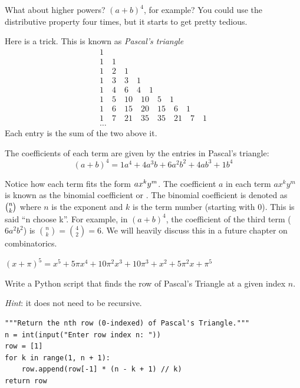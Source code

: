 What about higher powers? $(a + b)^4$, for example? You could use the
distributive property four times, but it starts to get pretty tedious.

Here is a trick. This is known as \emph{Pascal's triangle}
\begin{equation*}
\begin{array}{c}
 1 \\
 1 \quad 1 \\
 1 \quad 2 \quad 1 \\
 1 \quad 3 \quad 3 \quad 1 \\
 1 \quad 4 \quad 6 \quad 4 \quad 1 \\
 1 \quad 5 \quad 10 \quad 10 \quad 5 \quad 1 \\
 1 \quad 6 \quad 15 \quad 20 \quad 15 \quad 6 \quad 1 \\
 1 \quad 7 \quad 21 \quad 35 \quad 35 \quad 21 \quad 7 \quad 1 \\
 \ldots
\end{array}
\end{equation*}
Each entry is the sum of the two above it.

The coefficients of each term are given by the entries in Pascal's triangle:
\begin{equation*}
(a + b)^4 = 1a^4 + 4a^3b + 6a^2 b^2 + 4 a b^3 + 1 b^4   
\end{equation*}

Notice how each term fits the form ${\displaystyle \textstyle ax^{k}y^{m}}$. The coefficient ${\displaystyle a}$ 
in each term $\textstyle ax^{k}y^{m}$ is known as the binomial coefficient or . The binomial coefficient is denoted 
as ${\displaystyle \textstyle \binom{n}{k}}$ where $n$ is the exponent and $k$ is the term number (starting with 0). 
This is said ``n choose k''.  For example, in $(a + b)^4$, the coefficient of the third term 
($6a^2b^2$) is $\binom{n}{k}=\binom{4}{2} = 6$. We will heavily discuss this in a future chapter on combinatorics.

\begin{Exercise}[title={Using Pascal's Triangle}, label=pascalbinomial]
\end{Exercise}
\begin{Answer}[ref=pascalbinomial]
  $(x + \pi)^5 = x^5 + 5\pi x^4 + 10\pi^2 x^3 + 10 \pi^3 + x^2 + 5 \pi^2 x + \pi^5$
\end{Answer}

\begin{Exercise}[title={Coding Pascal's Triangle}, label={ex:pascalrow}]

Write a Python script that finds the row of Pascal's Triangle at a given index $n$. 

\textit{Hint}: it does not need to be recursive.

\end{Exercise}

\begin{Answer}[ref={ex:pascalrow}]

\begin{verbatim}
"""Return the nth row (0-indexed) of Pascal's Triangle."""
n = int(input("Enter row index n: "))
row = [1]
for k in range(1, n + 1):
    row.append(row[-1] * (n - k + 1) // k)
return row
\end{verbatim}

\end{Answer}